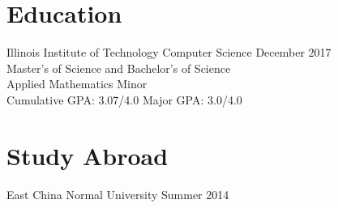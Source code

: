 \documentclass[10pt]{res}
\begin{document}
\address{www.anthonyhicksiii.com \\ https://github.com/TheRealMingo}
\address{anthony@anthonyhicksiii.com}

\setlength\itemsep{0em}

\begin{resume}
\section{Education}
	Illinois Institute of Technology \hfill
	{\centering Computer Science} 
	 \hfill December 2017 \\
	Master's of Science and Bachelor's of Science \\
	Applied Mathematics Minor \\
	Cumulative GPA: 3.07/4.0 \hfill
	Major GPA: 3.0/4.0 
\section{Study Abroad}
	East China Normal University \hfill Summer 2014  

\end{resume}
\end{document}
